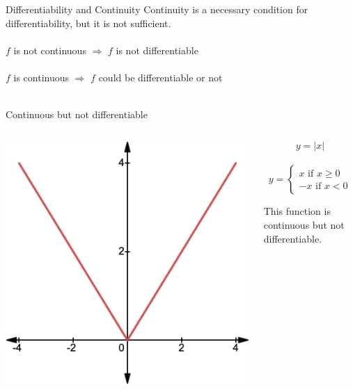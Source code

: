 \documentclass{./../../Latex/teaching_slides}
\begin{document}
\begin{frame}{Differentiability and Continuity}
Continuity is a necessary condition for differentiability, but it is not sufficient. \\~\\

$f$ is not continuous $\Longrightarrow$ $f$ is not differentiable \\~\\

$f$ is continuous $\Longrightarrow$ $f$ could be differentiable or not \\~\\

\end{frame}

\begin{frame}{Continuous but not differentiable}
\vspace{1em}
\centering
\begin{columns}[c]
\begin{column}{0.6\textwidth}
\includegraphics[scale=0.225]{cont_not_diff.png}
\end{column}
\begin{column}{0.4\textwidth}
$$ y = |x| $$\\

$$ y = \begin{cases} x  \text{ if }x \geq 0  \\
-x \text{ if }x<0 \end{cases} $$
\vspace{1em}

This function is continuous but not differentiable. 
\end{column} 
\end{columns}
\end{frame}
\end{document}

